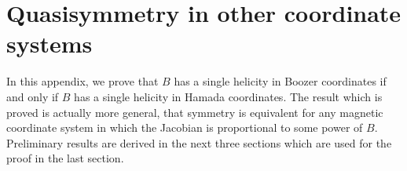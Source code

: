 \chapter{Quasisymmetry in other coordinate systems}
\label{a:Hamada}

In this appendix, we prove that $B$ has a single helicity in Boozer
coordinates if and only if $B$ has a single helicity in Hamada coordinates.
The result which is proved is actually more general, that symmetry is
equivalent for any magnetic coordinate system in which the Jacobian is
proportional to some power of $B$. Preliminary results are derived in the
next three sections which are used for the proof in the last section.
